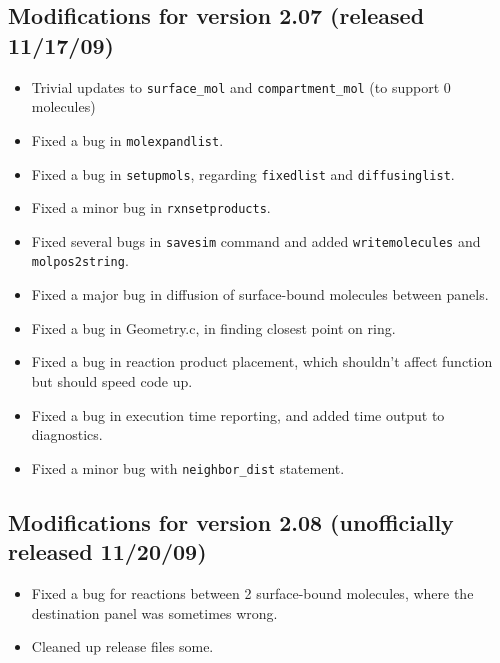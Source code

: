 \documentclass {scrbook}
\newcommand {\ttt} {\texttt}
\begin{document}
\subsection{Modifications for version 2.07 (released 11/17/09)}
\begin{itemize}
\item Trivial updates to \ttt{surface\_mol} and \ttt{compartment\_mol} (to support 0 molecules)
\item Fixed a bug in \ttt{molexpandlist}.
\item Fixed a bug in \ttt{setupmols}, regarding \ttt{fixedlist} and \ttt{diffusinglist}.
\item Fixed a minor bug in \ttt{rxnsetproducts}.
\item Fixed several bugs in \ttt{savesim} command and added \ttt{writemolecules} and \ttt{molpos2string}.
\item Fixed a major bug in diffusion of surface-bound molecules between panels.
\item Fixed a bug in Geometry.c, in finding closest point on ring.
\item Fixed a bug in reaction product placement, which shouldn't affect function but should speed code up.
\item Fixed a bug in execution time reporting, and added time output to diagnostics.
\item Fixed a minor bug with \ttt{neighbor\_dist} statement.
\end{itemize}

\subsection{Modifications for version 2.08 (unofficially released 11/20/09)}
\begin{itemize}
\item Fixed a bug for reactions between 2 surface-bound molecules, where the destination panel was sometimes wrong.
\item Cleaned up release files some.
\end{itemize}
\end{document}
